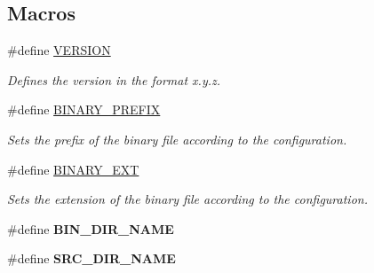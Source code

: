 \subsection*{Macros}
\begin{DoxyCompactItemize}
\item 
\hypertarget{group___automatic___variables_ga1c6d5de492ac61ad29aec7aa9a436bbf}{\#define \hyperlink{group___automatic___variables_ga1c6d5de492ac61ad29aec7aa9a436bbf}{V\+E\+R\+S\+I\+O\+N}}\label{group___automatic___variables_ga1c6d5de492ac61ad29aec7aa9a436bbf}

\begin{DoxyCompactList}\small\item\em Defines the version in the format x.\+y.\+z. \end{DoxyCompactList}\item 
\hypertarget{group___automatic___variables_ga7564a1406feda468ce0cb03cc8f70216}{\#define \hyperlink{group___automatic___variables_ga7564a1406feda468ce0cb03cc8f70216}{B\+I\+N\+A\+R\+Y\+\_\+\+P\+R\+E\+F\+I\+X}}\label{group___automatic___variables_ga7564a1406feda468ce0cb03cc8f70216}

\begin{DoxyCompactList}\small\item\em Sets the prefix of the binary file according to the configuration. \end{DoxyCompactList}\item 
\hypertarget{group___automatic___variables_ga33221a22bc4fd9183788b7a02eb21a1b}{\#define \hyperlink{group___automatic___variables_ga33221a22bc4fd9183788b7a02eb21a1b}{B\+I\+N\+A\+R\+Y\+\_\+\+E\+X\+T}}\label{group___automatic___variables_ga33221a22bc4fd9183788b7a02eb21a1b}

\begin{DoxyCompactList}\small\item\em Sets the extension of the binary file according to the configuration. \end{DoxyCompactList}\item 
\hypertarget{group___automatic___variables_ga15b68a57a767111eeccbb4361ef27d28}{\#define {\bfseries B\+I\+N\+\_\+\+D\+I\+R\+\_\+\+N\+A\+M\+E}}\label{group___automatic___variables_ga15b68a57a767111eeccbb4361ef27d28}

\item 
\hypertarget{group___automatic___variables_gae4c5345f24367773479bbdc89f11ad73}{\#define {\bfseries S\+R\+C\+\_\+\+D\+I\+R\+\_\+\+N\+A\+M\+E}}\label{group___automatic___variables_gae4c5345f24367773479bbdc89f11ad73}


\end{DoxyCompactItemize}
